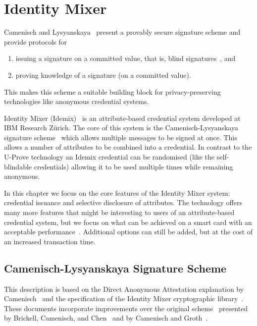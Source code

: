 \chapter{Identity Mixer}

Camenisch and Lysyanskaya~\cite{CamenischLysyanskaya2002,Lysyanskaya2002}
present a provably secure signature scheme and provide protocols for
\begin{enumerate}
  \item issuing a signature on a committed value, that is, blind
    signatures~\cite{Chaum1983}, and
  \item proving knowledge of a signature (on a committed value).
\end{enumerate}
This makes this scheme a suitable building block for privacy-preserving
technologies like anonymous credential systems.

Identity Mixer (Idemix)~\cite{IdemixCrypto2012} is an attribute-based
credential system developed at IBM Research Z\"urich. The core of this system is
the Camenisch-Lysyanskaya signature
scheme~\cite{CamenischLysyanskaya2002,Lysyanskaya2002} which allows multiple
messages to be signed at once. This allows a number of attributes to be combined
into a credential. In contrast to the U-Prove technology an Idemix credential
can be randomised (like the self-blindable credentials) allowing it to be used
multiple times while remaining anonymous.

In this chapter we focus on the core features of the Identity Mixer system:
credential issuance and selective disclosure of attributes. The technology
offers many more features that might be interesting to users of an
attribute-based credential system, but we focus on what can be achieved on a
smart card with an acceptable performance~\cite{VullersAlpar2013}. Additional
options can still be added, but at the cost of an increased transaction time.

\section{Camenisch-Lysyanskaya Signature Scheme}


This description is based on the Direct Anonymous Attestation explanation by
Camenisch~\cite{Camenisch2007} and the specification of the Identity Mixer
cryptographic library~\cite{IdemixCrypto2012}. These documents incorporate
improvements over the original scheme~\cite{CamenischLysyanskaya2002} presented
by Brickell, Camenisch, and Chen~\cite{BrickellCC2004} and by Camenisch and
Groth~\cite{CamenischGroth2004}.


